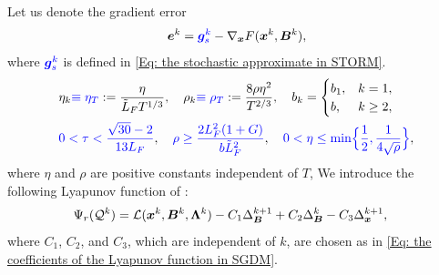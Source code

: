 Let us denote the gradient error \[\bm{e}^{k} = {\color{blue}\bm{g}_s^{k}} - \nabla_{\bm{x}}F(\bm{x}^{k}, \bm{B}^{k})
,\]where ${\color{blue}\bm{g}_s^k}$ is defined in \eqref{Eq: the stochastic approximate in STORM}. 
\begin{align}
    &\eta_k \blue{\equiv\eta_T}:= \frac{\eta}{\tilde{L}_{F} T^{1/3}},\quad
    \rho_k \blue{\equiv\rho_T}:= \frac{8\rho\eta^2}{T^{2/3}},\quad
    b_k = \begin{cases} b_1, & k = 1, \\ b, & k \geq 2, \end{cases}
    \label{Eq: the parameters conditions in dualhash-storm}\\
    &\blue{0<\tau<\frac{\sqrt{30}-2}{13L_F}},\quad
    \blue{\rho\ge\frac{2L_F^{2}(1+G)}{b\tilde{L}_F^{2}}},\quad
    \blue{0<\eta\le\min\Bigl\{\frac12,\frac{1}{4\sqrt{\rho}}\Bigr\}},
    \label{Eq: the constants for storm}
\end{align} 
where  $\eta$ and $\rho$ are positive constants independent of $T$,  We  introduce the following Lyapunov function of :
\begin{align}
    \Psi_r(\mathcal{Q}^{k}) &= \calL(\bx^{k}, \bm{B}^{k}, \bLmbd^{k})
    - C_{1}\Delta_{\bB}^{k+1}+ C_{2}\Delta_{\bB}^{k}- C_{3}\Delta_{\bm{x}}^{k+1},
    \label{Eq: the Lyapunov function in STORM}
\end{align}
where $C_1$, $C_2$, and $C_3$, which are independent of $k$, are chosen as in
\eqref{Eq: the coefficients of the Lyapunov function in SGDM}. 

